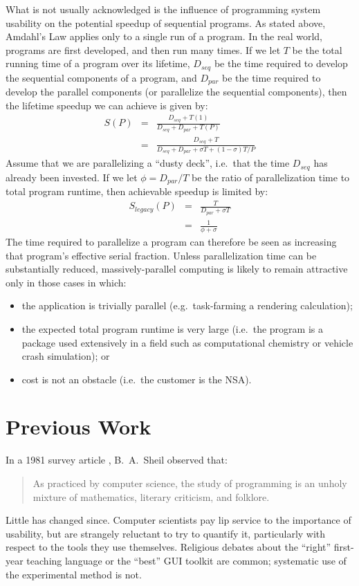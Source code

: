 What is not usually acknowledged is
the influence of programming system usability on
the potential speedup of sequential programs.
As stated above, Amdahl's Law applies only to a single run of a program.
In the real world, programs are first developed, and then run many times.
If we let $T$ be the total running time of a program over its lifetime,
$D_{seq}$ be the time required to develop the sequential components of a program,
and $D_{par}$ be the time required to develop the parallel components
(or parallelize the sequential components),
then the lifetime speedup we can achieve is given by:
\begin{eqnarray*}
S(P)	& =	& \frac{D_{seq} + T(1)}{D_{seq} + D_{par} + T(P)}	\\
	& =	& \frac{D_{seq} + T}{D_{seq} + D_{par} + {{\sigma}T} + {{(1-{\sigma})T}}/{P}}
\end{eqnarray*}
Assume that we are parallelizing a ``dusty deck'',
i.e.\ that the time $D_{seq}$ has already been invested.
If we let $\phi = D_{par}/T$ be the ratio of parallelization time to total program runtime,
then achievable speedup is limited by:
\begin{eqnarray*}
S_{legacy}(P)	& =	& \frac{T}{D_{par} + {\sigma}T}		\\
		& =	& \frac{1}{{\phi} + {\sigma}}
\end{eqnarray*}
The time required to parallelize a program can therefore be seen
as increasing that program's effective serial fraction.
Unless parallelization time can be substantially reduced,
massively-parallel computing is likely to remain attractive only in those cases in which:
\begin{itemize}
\item	the application is trivially parallel (e.g.\ task-farming a rendering calculation);
\item	the expected total program runtime is very large
	(i.e.\ the program is a package used extensively in a field
	such as computational chemistry or vehicle crash simulation);
	or
\item	cost is not an obstacle (i.e.\ the customer is the NSA).
\end{itemize}

\section{Previous Work\label{s:previous}}

In a 1981 survey article \cite{b:psych-prog-survey}, B.~A.\ Sheil observed that:
\begin{quote}
As practiced by computer science,
the study of programming is an unholy mixture of mathematics,
literary criticism,
and folklore.
\end{quote}
Little has changed since.
Computer scientists pay lip service to the importance of usability,
but are strangely reluctant to try to quantify it,
particularly with respect to the tools they use themselves.
Religious debates about the ``right'' first-year teaching language
or the ``best'' GUI toolkit are common;
systematic use of the experimental method is not.

